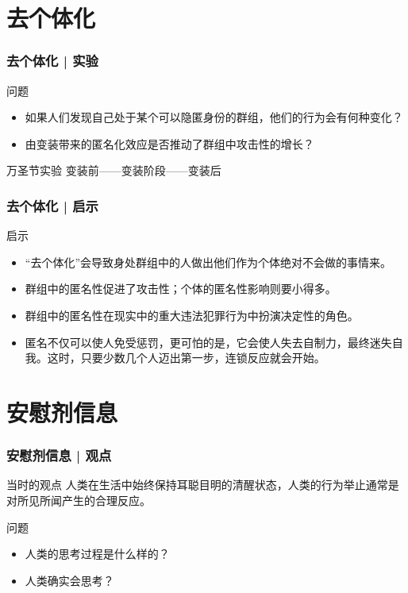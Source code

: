 \section{去个体化}
\begin{frame}
  \frametitle{去个体化 | 实验}
  \begin{block}{问题}
    \begin{itemize}
      \item 如果人们发现自己处于某个可以隐匿身份的群组，他们的行为会有何种变化？
      \item 由变装带来的匿名化效应是否推动了群组中攻击性的增长？
    \end{itemize}
  \end{block}
  \pause
  \begin{block}{万圣节实验}
    变装前——变装阶段——变装后
  \end{block}
\end{frame}

\begin{frame}
  \frametitle{去个体化 | 启示}
  \begin{block}{启示}
    \begin{itemize}
      \item “去个体化”会导致身处群组中的人做出他们作为个体绝对不会做的事情来。
      \item 群组中的匿名性促进了攻击性；个体的匿名性影响则要小得多。
      \item 群组中的匿名性在现实中的重大违法犯罪行为中扮演决定性的角色。
      \item 匿名不仅可以使人免受惩罚，更可怕的是，它会使人失去自制力，最终迷失自我。这时，只要少数几个人迈出第一步，连锁反应就会开始。
    \end{itemize}
  \end{block}
\end{frame}

\section{安慰剂信息}
\begin{frame}
  \frametitle{安慰剂信息 | 观点}
  \begin{block}{当时的观点}
    人类在生活中始终保持耳聪目明的清醒状态，人类的行为举止通常是对所见所闻产生的合理反应。
  \end{block}
  \pause
  \begin{block}{问题}
    \begin{itemize}
      \item 人类的思考过程是什么样的？
      \item 人类确实会思考？
    \end{itemize}
  \end{block}
\end{frame}

